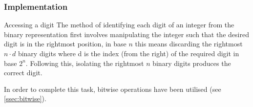 \documentclass[12pt]{article}
\begin{document}
	\subsubsection{Implementation}
	Accessing a digit
	The method of identifying each digit of an integer from the binary representation first involves manipulating the integer such that the desired digit is in the rightmost position, in base $n$ this means discarding the rightmost $n \cdot d$ binary digits where d is the index (from the right) of the required digit in base $2^n$. Following this, isolating the rightmost $n$ binary digits produces the correct digit.  
		\par
	In order to complete this task, bitwise operations have been utilised (see \ref{ssec:bitwise}).


	\begin{table}[!htb]
		\centering
		

\end{table}
\end{document}
